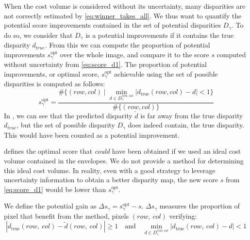 When the cost volume is considered without its uncertainty, many disparities are not correctly estimated by \cref{eq:winner_takes_all}. We thus want to quantify the potential score improvements contained in the set of potential disparities $D_\gamma$. To do so, we consider that $D_\gamma$ is a potential improvements if it contains the true disparity $d_{true}$. From this we can compute the proportion of potential improvements $s_\gamma^{\text{opt}}$ over the whole image, and compare it to the score $s$ computed without uncertainty from \cref{eq:score_d1}. The proportion of potential improvements, or optimal score, \( s_\gamma^{\text{opt}} \) achievable using the set of possible disparities is computed as follows:
\begin{equation}\label{eq:optimal_score}
    s_\gamma^{\text{opt}} = \frac{\#\{(row, col) \mid \min_{d \in D_\gamma^{row, col}} |d_{\mathrm{true}}(row, col) - d| < 1\}}{\#\{(row, col)\}}
\end{equation}
In , we can see that the predicted disparity $\tilde{d}$ is far away from the true disparity $d_{true}$, but the set of possible disparity $D_\gamma$ does indeed contain, the true disparity. This would have been counted as a potential improvement.

\begin{remark}
     defines the optimal score that \textit{could} have been obtained if we used an ideal cost volume contained in the envelopes. We do not provide a method for determining this ideal cost volume. In reality, even with a good strategy to leverage uncertainty information to obtain a better disparity map, the new score $s$ from \cref{eq:score_d1} would be lower than $s_\gamma^{\text{opt}}$.
\end{remark}

We define the potential gain as \( \Delta s_\gamma = s_\gamma^{\text{opt}} - s \). $\Delta s_\gamma$ measures the proportion of pixel that benefit from the method, \ie pixels $(row, ~col)$ verifying:
\begin{equation}
    |d_{\mathrm{true}}(row, ~col) - \tilde{d}(row, ~col)| \geq 1 \quad \text{and} \quad \min_{d \in D_\gamma^{row, col}} |d_{\mathrm{true}}(row, ~col) - d| < 1
\end{equation}

